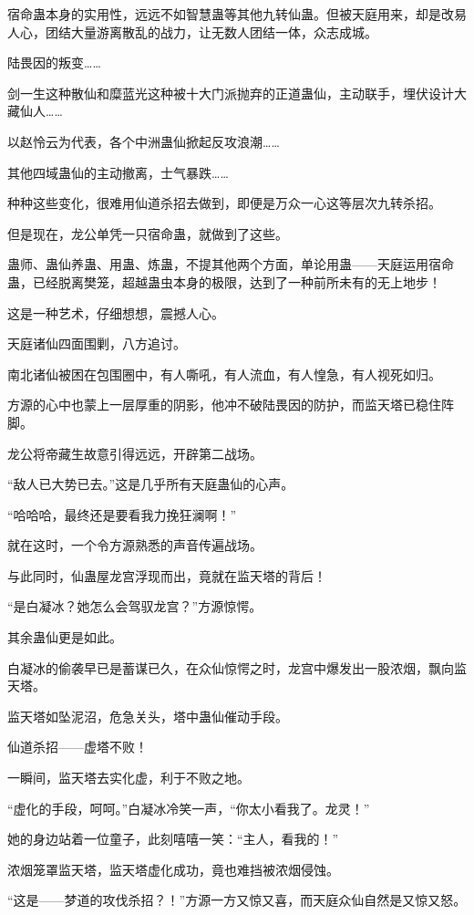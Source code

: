\begin{this_body}
宿命蛊本身的实用性，远远不如智慧蛊等其他九转仙蛊。但被天庭用来，却是改易人心，团结大量游离散乱的战力，让无数人团结一体，众志成城。

陆畏因的叛变……

剑一生这种散仙和糜蓝光这种被十大门派抛弃的正道蛊仙，主动联手，埋伏设计大藏仙人……

以赵怜云为代表，各个中洲蛊仙掀起反攻浪潮……

其他四域蛊仙的主动撤离，士气暴跌……

种种这些变化，很难用仙道杀招去做到，即便是万众一心这等层次九转杀招。

但是现在，龙公单凭一只宿命蛊，就做到了这些。

蛊师、蛊仙养蛊、用蛊、炼蛊，不提其他两个方面，单论用蛊——天庭运用宿命蛊，已经脱离樊笼，超越蛊虫本身的极限，达到了一种前所未有的无上地步！

这是一种艺术，仔细想想，震撼人心。

天庭诸仙四面围剿，八方追讨。

南北诸仙被困在包围圈中，有人嘶吼，有人流血，有人惶急，有人视死如归。

方源的心中也蒙上一层厚重的阴影，他冲不破陆畏因的防护，而监天塔已稳住阵脚。

龙公将帝藏生故意引得远远，开辟第二战场。

“敌人已大势已去。”这是几乎所有天庭蛊仙的心声。

“哈哈哈，最终还是要看我力挽狂澜啊！”

就在这时，一个令方源熟悉的声音传遍战场。

与此同时，仙蛊屋龙宫浮现而出，竟就在监天塔的背后！

“是白凝冰？她怎么会驾驭龙宫？”方源惊愕。

其余蛊仙更是如此。

白凝冰的偷袭早已是蓄谋已久，在众仙惊愕之时，龙宫中爆发出一股浓烟，飘向监天塔。

监天塔如坠泥沼，危急关头，塔中蛊仙催动手段。

仙道杀招——虚塔不败！

一瞬间，监天塔去实化虚，利于不败之地。

“虚化的手段，呵呵。”白凝冰冷笑一声，“你太小看我了。龙灵！”

她的身边站着一位童子，此刻嘻嘻一笑：“主人，看我的！”

浓烟笼罩监天塔，监天塔虚化成功，竟也难挡被浓烟侵蚀。

“这是——梦道的攻伐杀招？！”方源一方又惊又喜，而天庭众仙自然是又惊又怒。


\end{this_body}
